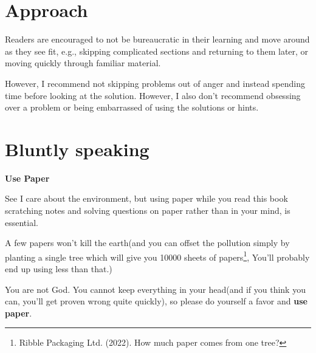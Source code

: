 \section{Approach}
Readers are encouraged to not be bureaucratic in their learning and move around as they see fit, e.g., 
skipping complicated sections and returning to them later, or moving quickly through familiar material.\par
However, I recommend not skipping problems out of anger and instead spending time before looking at the solution. 
However, I also don't recommend obsessing over a problem or being embarrassed of using the solutions or hints. \par

\section{Bluntly speaking}
\begin{mdframed}
    \textbf{Use Paper}
\end{mdframed}
See I care about the environment, but using paper while you read this book scratching notes
 and solving questions on paper rather than in your mind, is essential. \par
  A few papers won't kill the earth(and you can offset the pollution simply by planting a single tree which will give you 10000 sheets of 
 papers\footnote{Ribble Packaging Ltd. (2022). How much paper comes from one tree?}, You'll probably end up using less than that.)\par
You are not God. You cannot keep everything in your head(and if you think you can, you'll get proven wrong quite quickly), 
so please do yourself a favor and \textbf{use paper}.

